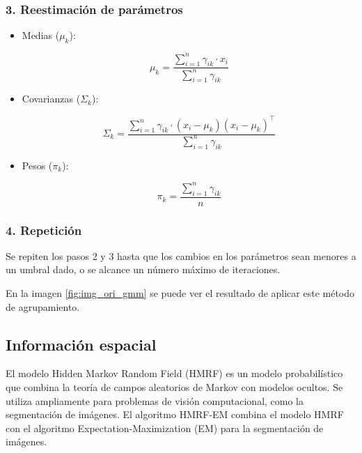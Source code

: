 \subsubsection{3. Reestimación de parámetros}

\begin{itemize}
\setlength{\itemsep}{-1ex}
    \item{\begin{flushleft} Medias ($\mu_k$):  \end{flushleft}}

    $$\mu_k =\frac{\sum_{i=1}^n \gamma_{ik} \cdot x_i }{\sum_{i=1}^n \gamma_{ik} }$$

    \item{\begin{flushleft} Covarianzas ($\Sigma_k$): \end{flushleft}}

    $$\Sigma_k =\frac{\sum_{i=1}^n \gamma_{ik} \cdot (x_i -\mu_k )(x_i -\mu_k )^{\top } }{\sum_{i=1}^n \gamma_{ik} }$$

    \item{\begin{flushleft} Pesos ($\pi_k$): \end{flushleft}}
    
    $$\pi_k =\frac{\sum_{i=1}^n \gamma_{ik} }{n}$$
\end{itemize}

\subsubsection{4. Repetición}

Se repiten los pasos 2 y 3 hasta que los cambios en los parámetros sean menores a un umbral dado, o se alcance un número máximo de iteraciones.

En la imagen \ref{fig:img_ori_gmm} se puede ver el resultado de aplicar este método de agrupamiento.

\subsection{Información espacial}\label{informacion-espacial}

El modelo Hidden Markov Random Field (HMRF) \cite{wang2012hmrf} es un modelo probabilístico que combina la teoría de campos aleatorios de Markov con modelos ocultos. Se utiliza ampliamente para problemas de visión computacional, como la segmentación de imágenes. El algoritmo HMRF-EM combina el modelo HMRF con el algoritmo Expectation-Maximization (EM) para la segmentación de imágenes.

